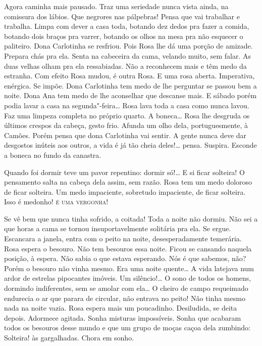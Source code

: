 \begin{linenumbers}
Agora caminha mais pausado. Traz uma seriedade nunca vista ainda, na
comissura dos lábios. Que negrores nas pálpebras! Pensa que vai
trabalhar e trabalha. Limpa com dever a casa toda, botando dez dedos pra
fazer a comida, botando dois braços pra varrer, botando os olhos na mesa
pra não esquecer o paliteiro. Dona Carlotinha se resfriou. Pois Rosa lhe
dá uma porção de amizade. Prepara chás pra ela. Senta na cabeceira da
cama, velando muito, sem falar. As duas velhas olham pra ela
ressabiadas. Não a reconhecem mais e têm medo da estranha. Com efeito
Rosa mudou, é outra Rosa. E uma rosa aberta. Imperativa, enérgica. Se
impõe. Dona Carlotinha tem medo de lhe perguntar se passou bem a noite.
Dona Ana tem medo de lhe aconselhar que descanse mais. E sábado porém
podia lavar a casa na segunda"-feira\ldots{} Rosa lava toda a casa como nunca
lavou. Faz uma limpeza completa no próprio quarto. A boneca\ldots{} Rosa lhe
desgruda os últimos crespos da cabeça, gesto frio. Afunda um olho dela,
portuguesmente, à Camões. Porém pensa que dona Carlotinha vai sentir. A
gente nunca deve dar desgostos inúteis aos outros, a vida é já tão cheia
deles!\ldots{} pensa. Suspira. Esconde a boneca no fundo da canastra.

Quando foi dormir teve um pavor repentino: dormir só!\ldots{} E si ficar
solteira! O pensamento salta na cabeça dela assim, sem razão. Rosa tem
um medo doloroso de ficar solteira. Um medo impaciente, sobretudo
impaciente, de ficar solteira. Isso é medonho! \textsc{é uma vergonha}! 

Se vê bem que nunca tinha sofrido, a coitada! Toda a noite não dormiu.
Não sei a que horas a cama se tornou insuportavelmente solitária pra
ela. Se ergue. Escancara a janela, entra com o peito na noite,
desesperadamente temerária. Rosa espera o besouro. Não tem besouros essa
noite. Ficou se cansando naquela posição, à espera. Não sabia o que
estava esperando. Nós é que sabemos, não? Porém o besouro não vinha
mesmo. Era uma noite quente\ldots{} A vida latejava num ardor de estrelas
pipocantes imóveis. Um silêncio!\ldots{} O sono de todos os homens, dormindo
indiferentes, sem se amolar com ela\ldots{} O cheiro de campo requeimado
endurecia o ar que parara de circular, não entrava no peito! Não tinha
mesmo nada na noite vazia. Rosa espera mais um poucadinho. Desiludida,
se deita depois. Adormece agitada. Sonha misturas impossíveis. Sonha que
acabaram todos os besouros desse mundo e que um grupo de moças caçoa
dela zumbindo: Solteira! às gargalhadas. Chora em sonho.


\end{linenumbers}
